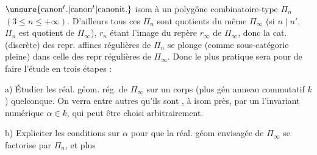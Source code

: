 $\unsure{\text{canon}^{t}.|\text{canon}^{t}|\text{canonit.}}$ isom à un polygône combinatoire-type
$\Pi_n$ $(3\leq n\leq+\infty)$. D'ailleurs
tous ces $\Pi_n$ sont  quotients du
même $\Pi_\infty$ (si $n\mid n'$, $\Pi_n$ est quotient
de $\Pi_\infty$), $r_n$  étant l'image du repère $r_\infty$ de
$\Pi_\infty$, donc la cat. (discrète) des repr. affines
régulières de $\Pi_n$ se plonge (comme
sous-catégorie pleine) dans celle des repr
régulières de $\Pi_\infty$. Donc le plus
pratique sera pour  de faire l'étude
en trois étapes :

a) Étudier les réal. géom. rég. de $\Pi_\infty$
sur un corps (plus gén anneau commutatif $k$)
 quelconque. On verra entre autres
qu'ils sont , à isom près, par un
l'invariant numérique $\alpha\in k$, qui peut
être choisi arbitrairement.

b) Expliciter les conditions sur $\alpha$
pour que la réal. géom envisagée de
$\Pi_\infty$ se factorise par $\Pi_n$, et plus
